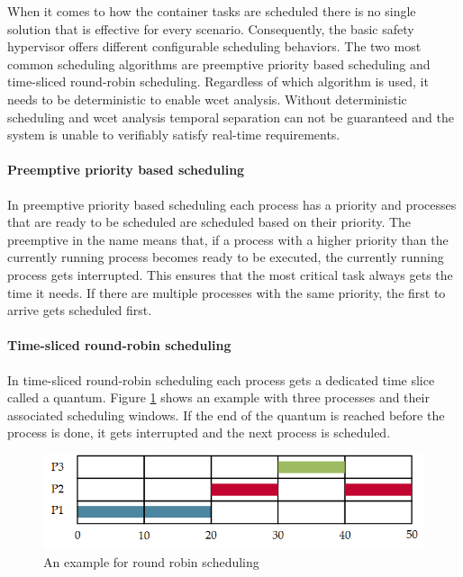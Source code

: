 When it comes to how the container tasks are scheduled there is no single solution that is effective for every scenario. Consequently, the basic safety hypervisor offers different configurable scheduling behaviors. The two most common scheduling algorithms are preemptive priority based scheduling and time-sliced round-robin scheduling. Regardless of which algorithm is used, it needs to be deterministic to enable \acrlong{wcet} analysis. Without deterministic scheduling and \acrshort{wcet} analysis temporal separation can not be guaranteed and the system is unable to verifiably satisfy real-time requirements.

\paragraph{Preemptive priority based scheduling}
In preemptive priority based scheduling each process has a priority and processes that are ready to be scheduled are scheduled based on their priority.
The preemptive in the name means that, if a process with a higher priority than the currently running process becomes ready to be executed, the currently running process gets interrupted. This ensures that the most critical task always gets the time it needs. If there are multiple processes with the same priority, the first to arrive gets scheduled first.

\paragraph{Time-sliced round-robin scheduling}
In time-sliced round-robin scheduling each process gets a dedicated time slice called a quantum. Figure \ref{fig:round_robin_example}  shows an example with three processes and their associated scheduling windows. If the end of the quantum is reached before the process is done, it gets interrupted and the next process is scheduled.
\begin{figure}[ht!]
\centering
\includegraphics[scale=0.75]{Figures/round_robin_example.png}
\decoRule
\caption{An example for round robin scheduling}
\label{fig:round_robin_example}
\end{figure}

